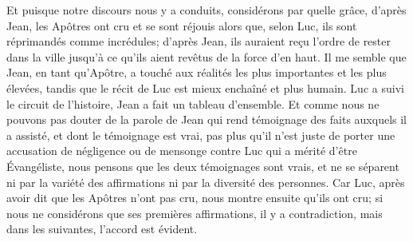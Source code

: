 Et puisque notre discours nous y a conduits,
	considérons par quelle grâce, d’après Jean,
		les Apôtres ont cru et se sont réjouis
	alors que, selon Luc, ils sont réprimandés comme incrédules;
	d’après Jean, ils auraient reçu l’ordre de rester dans la ville
	jusqu’à ce qu’ils aient revêtus de la force d’en haut.
Il me semble que Jean, en tant qu’Apôtre,
	a touché aux réalités les plus importantes et les plus élevées,
	tandis que le récit de Luc est mieux enchaîné et plus humain.
Luc a suivi le circuit de l’histoire,
	Jean a fait un tableau d’ensemble.
Et comme nous ne pouvons pas douter de la parole de Jean
	qui rend témoignage des faits auxquels il a assisté,
	et dont le témoignage est vrai,
	pas plus qu’il n’est juste
		de porter une accusation de négligence ou de mensonge contre Luc
	qui a mérité d’être Évangéliste,
	nous pensons que les deux témoignages sont vrais,
	et ne se séparent ni par la variété des affirmations
		ni par la diversité des personnes.
Car Luc, après avoir dit que les Apôtres n’ont pas cru,
	nous montre ensuite qu’ils ont cru;
	si nous ne considérons que ses premières affirmations, il y a contradiction,
	mais dans les suivantes, l’accord est évident.
